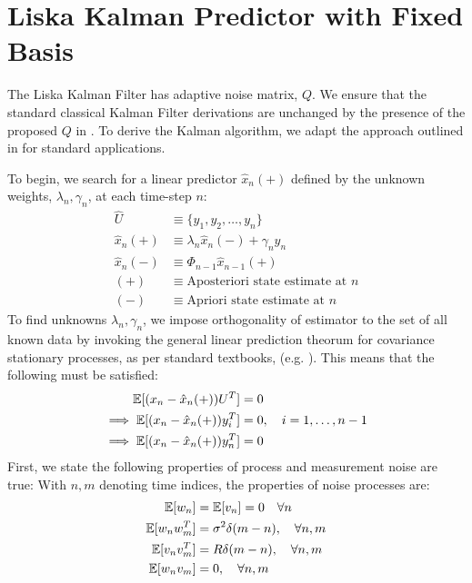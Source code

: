 \section{Liska Kalman Predictor with Fixed Basis} \label{sec:ap_liska_deriv}
The Liska Kalman Filter has adaptive noise matrix, $Q$. We ensure that the standard classical  Kalman Filter derivations are unchanged by the presence of the proposed $Q$ in \cite{livska2007}. To derive the Kalman algorithm, we adapt the approach outlined in \cite{grewal2001theory} for standard applications. 

To begin, we search for a linear predictor $\hat{x}_n(+)$ defined by the unknown weights, $\lambda_n, \gamma_n$, at each time-step $n$:
\begin{align}
\hat{U} & \equiv \{y_1, y_2,\dots, y_n\} \\
\hat{x}_n(+) & \equiv \lambda_n \hat{x}_n(-) + \gamma_n y_n \label{eqn:KF_predictor}\\
\hat{x}_n(-) & \equiv \Phi_{n-1} \hat{x}_{n-1}(+) \\
(+) &\equiv \text{Aposteriori state estimate at $n$}\\
(-) &\equiv \text{Apriori state estimate at $n$}
\end{align}
To find unknowns $\lambda_n, \gamma_n$, we impose orthogonality of estimator to the set of all known data by invoking the general linear prediction theorum for covariance stationary processes, as per standard textbooks, (e.g. \cite{grewal2001theory,karlin2012first}). This means that the following must be satisfied:
\begin{align}
\mathbb{E}[(x_n - \hat{x}_n(+))U^T] &= 0 \label{eqn:KF_reln_1}\\
\implies \mathbb{E}[(x_n - \hat{x}_n(+))y_i^T] &= 0, \quad i = 1,\dots, n-1 \label{eqn:KF_reln_2}\\
\implies \mathbb{E}[(x_n - \hat{x}_n(+))y_n^T] &= 0 \label{eqn:KF_reln_3}
\end{align}
First, we state the following properties of process and measurement noise are true:
With $n,m$ denoting time indices, the properties of noise processes are:
\begin{align}
\mathbb{E}[w_n] & = \mathbb{E}[v_n]= 0 \quad \forall n \label{eqn:KF_stat_noisemean}\\
\mathbb{E}[w_nw_m^T] &= \sigma^2 \delta(m-n),  \quad \forall n,m \label{eqn:KF_stat_noisepros}\\
\mathbb{E}[v_n v_m^T]&= R\delta(m-n), \quad  \forall n,m  \label{eqn:KF_stat_noisemsmt} \\
\mathbb{E}[w_n v_m] &= 0,  \quad \forall n,m \label{eqn:KF_stat_crosscorr}
\end{align} 
